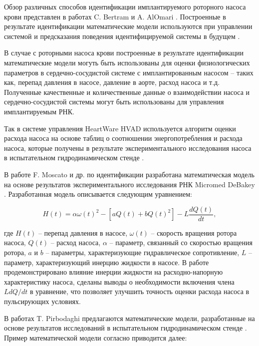 
Обзор различных способов идентификации имплантируемого роторного насоса крови представлен в работах C. Bertram и A. AlOmari \cite{bertram2005measurement, Controller_review}. Построенные в результате идентификации математические модели используются при управлении системой и предсказания поведения идентифицируемой системы в будущем \cite{identification_usa}. 

В случае с роторными насоса крови построенные в результате идентификации математические модели могуть быть использованы для оценки физиологических параметров в сердечно-сосудистой системе с имплантированным насосом -- таких как,  перепад давления в насосе, давление в аорте, расход насоса и т.\:д. Полученные качественные и количественные данные о взаимодействии насоса и сердечно-сосудистой системы могут быть использованы для управления имплантируемым РНК. 

Так в системе управления HeartWare HVAD используется алгоритм оценки расхода насоса на основе таблиц о соотношении энергопотребления и расхода насоса, которые получены в результате экспериментального исследования насоса в испытательном гидродинамическом стенде \cite{reyes2016accuracy}. 

В работе F. Moscato и др. по идентификации разработана математическая модель на основе результатов экспериментального исследования РНК Micromed DeBakey \cite{Moscato_2009}. Разработанная модель описывается следующим уравнением:

\begin{equation}
	H(t) = \alpha \omega(t)^2 - \left[ aQ(t) + bQ(t)^2 \right] - L\frac{dQ(t)}{dt},
	\label{eq:moscato_equation}
\end{equation}

\noindent где $H(t)$ -- перепад давления в насосе, $\omega(t)$ -- скорость вращения ротора насоса, $Q(t)$ -- расход насоса, $\alpha$ -- параметр, связанный со скоростью вращения ротора, $a$ и $b$ -- параметры, характеризующие гидравлическое сопротивление, $L$ -- параметр, характеризующий инерцию жидкости в насосе. В работе продемонстрировано влияние инерции жидкости на расходно-напорную характеристику насоса, сделаны выводы о необходимости включения члена $LdQ/dt$ в уравнение, что позволяет улучшить точность оценки расхода насоса в пульсирующих условиях.

В работах T. Pirbodaghi предлагаются математические модели, разработанные на основе результатов исследований в испытательном гидродинамическом стенде \cite{Pirbodaghi_2011, Pirbodaghi_2017}. Пример математической модели согласно \cite{Pirbodaghi_2017} приводится далее: 

